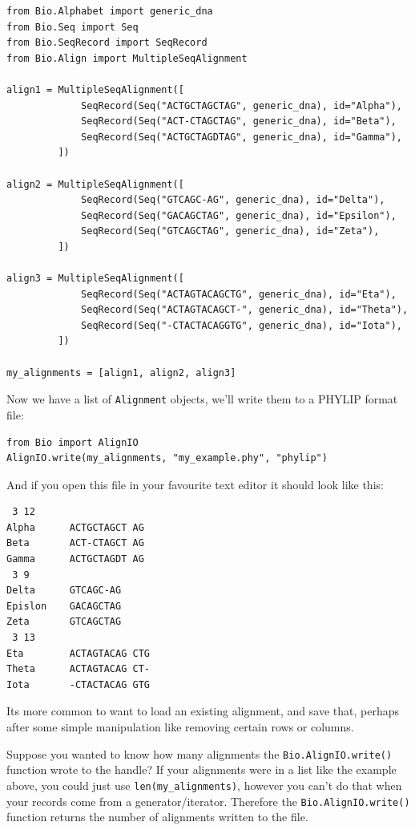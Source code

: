 \documentclass{report}
\begin{document}
\begin{verbatim}
from Bio.Alphabet import generic_dna
from Bio.Seq import Seq
from Bio.SeqRecord import SeqRecord
from Bio.Align import MultipleSeqAlignment

align1 = MultipleSeqAlignment([
             SeqRecord(Seq("ACTGCTAGCTAG", generic_dna), id="Alpha"),
             SeqRecord(Seq("ACT-CTAGCTAG", generic_dna), id="Beta"),
             SeqRecord(Seq("ACTGCTAGDTAG", generic_dna), id="Gamma"),
         ])

align2 = MultipleSeqAlignment([
             SeqRecord(Seq("GTCAGC-AG", generic_dna), id="Delta"),
             SeqRecord(Seq("GACAGCTAG", generic_dna), id="Epsilon"),
             SeqRecord(Seq("GTCAGCTAG", generic_dna), id="Zeta"),
         ])

align3 = MultipleSeqAlignment([
             SeqRecord(Seq("ACTAGTACAGCTG", generic_dna), id="Eta"),
             SeqRecord(Seq("ACTAGTACAGCT-", generic_dna), id="Theta"),
             SeqRecord(Seq("-CTACTACAGGTG", generic_dna), id="Iota"),
         ])

my_alignments = [align1, align2, align3]
\end{verbatim}

\noindent Now we have a list of \verb|Alignment| objects, we'll write them to a PHYLIP format file:

\begin{verbatim}
from Bio import AlignIO
AlignIO.write(my_alignments, "my_example.phy", "phylip")
\end{verbatim}

\noindent And if you open this file in your favourite text editor it should look like this:

\begin{verbatim}
 3 12
Alpha      ACTGCTAGCT AG
Beta       ACT-CTAGCT AG
Gamma      ACTGCTAGDT AG
 3 9
Delta      GTCAGC-AG
Epislon    GACAGCTAG
Zeta       GTCAGCTAG
 3 13
Eta        ACTAGTACAG CTG
Theta      ACTAGTACAG CT-
Iota       -CTACTACAG GTG
\end{verbatim}

Its more common to want to load an existing alignment, and save that, perhaps after some simple manipulation like removing certain rows or columns.

Suppose you wanted to know how many alignments the \verb|Bio.AlignIO.write()| function wrote to the handle? If your alignments were in a list like the example above, you could just use \verb|len(my_alignments)|, however you can't do that when your records come from a generator/iterator.  Therefore the \verb|Bio.AlignIO.write()| function returns the number of alignments written to the file.   
\end{document}
